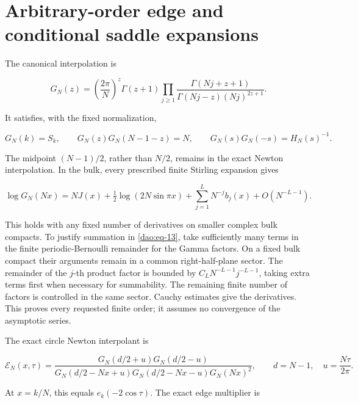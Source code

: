 \section{Arbitrary-order edge and conditional saddle expansions}\label{dao:sec-4}

The canonical interpolation is

\begin{equation}\label{dao:eq-13}
G_N(z)=\left(\frac{2\pi}{N}\right)^z\Gamma(z+1)
    \prod_{j\ge1}
     \frac{\Gamma(Nj+z+1)}{\Gamma(Nj-z)(Nj)^{2z+1}}.
\end{equation}

It satisfies, with the fixed normalization,

\begin{equation}\label{dao:eq-14}
G_N(k)=S_k,\qquad
 G_N(z)G_N(N-1-z)=N,\qquad
 G_N(s)G_N(-s)=H_N(s)^{-1}.
\end{equation}

The midpoint \((N-1)/2\), rather than \(N/2\), remains in the exact Newton interpolation. In the bulk, every prescribed finite Stirling expansion gives

\begin{equation}\label{dao:eq-15}
\log G_N(Nx)=NJ(x)+\tfrac12\log(2N\sin\pi x)
       +\sum_{j=1}^{L}N^{-j}b_j(x)+O(N^{-L-1}).
\end{equation}

This holds with any fixed number of derivatives on smaller complex bulk compacts. To justify summation in \eqref{dao:eq-13}, take sufficiently many terms in the finite periodic-Bernoulli remainder for the Gamma factors. On a fixed bulk compact their arguments remain in a common right-half-plane sector. The remainder of the \(j\)-th product factor is bounded by \(C_LN^{-L-1}j^{-L-1}\), taking extra terms first when necessary for summability. The remaining finite number of factors is controlled in the same sector. Cauchy estimates give the derivatives. This proves every requested finite order; it assumes no convergence of the asymptotic series.

The exact circle Newton interpolant is

\begin{equation}\label{dao:eq-16}
\mathcal E_N(x,\tau)=
 \frac{G_N(d/2+u)G_N(d/2-u)}
      {G_N(d/2-Nx+u)G_N(d/2-Nx-u)G_N(Nx)^2},
 \qquad d=N-1,\quad u=\frac{N\tau}{2\pi}.
\end{equation}

At \(x=k/N\), this equals \(e_k(-2\cos\tau)\). The exact edge multiplier is

